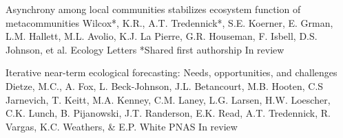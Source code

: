 

\begin{pubentries}

  \pubentry
    {Asynchrony among local communities stabilizes ecosystem function of metacommunities} %
    {Wilcox*, K.R., A.T. Tredennick*, S.E. Koerner, E. Grman, L.M. Hallett, M.L. Avolio, K.J. La Pierre, G.R. Houseman, F. Isbell, D.S. Johnson, et al.} %
    {Ecology Letters} %
    {*Shared first authorship} %
    {In review} %

  \pubentry
    {Iterative near-term ecological forecasting: Needs, opportunities, and challenges} %
    {Dietze, M.C., A. Fox, L. Beck-Johnson, J.L. Betancourt, M.B. Hooten, C.S Jarnevich, T. Keitt, M.A. Kenney, C.M. Laney, L.G. Larsen, H.W. Loescher, C.K. Lunch, B. Pijanowski, J.T. Randerson, E.K. Read, A.T. Tredennick, R. Vargas, K.C. Weathers, \& E.P. White} %
    {PNAS} %
    {} %
    {In review} %

\end{pubentries}
